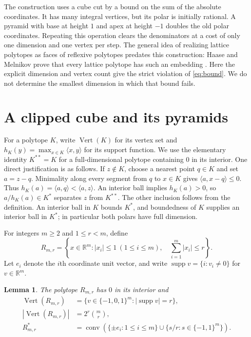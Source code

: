 \documentclass[11pt]{article}
\newtheorem{lemma}[theorem]{Lemma}
\newcommand{\conv}{\operatorname{conv}}
\newcommand{\vertices}{\operatorname{Vert}}
\newcommand{\supp}{\operatorname{supp}}
\begin{document}
The construction uses a cube cut by a bound on the sum of the absolute
coordinates. It has many integral vertices, but its polar is initially
rational. A pyramid with base at height $1$ and apex at height $-1$ doubles
the old polar coordinates. Repeating this operation clears the denominators
at a cost of only one dimension and one vertex per step.
The general idea of realizing lattice polytopes as faces of reflexive
polytopes predates this construction: Haase and Melnikov prove that every
lattice polytope has such an embedding \cite[Proposition~2.2]{HM}.
Here the explicit dimension and vertex count give the strict violation
of \eqref{eq:bound}. We do not determine the smallest dimension in which
that bound fails.

\section{A clipped cube and its pyramids}

For a polytope $K$, write $\vertices(K)$ for its vertex set and
$h_K(y)=\max_{x\in K}\langle x,y\rangle$ for its support function.
We use the elementary identity $K^{**}=K$ for a full-dimensional
polytope containing $0$ in its interior. One direct justification is as
follows. If $z\notin K$, choose a nearest point $q\in K$ and set $a=z-q$.
Minimality along every segment from $q$ to $x\in K$ gives
$\langle a,x-q\rangle\leq0$. Thus
$h_K(a)=\langle a,q\rangle<\langle a,z\rangle$.
An interior ball implies $h_K(a)>0$, so $a/h_K(a)\in K^*$ separates $z$
from $K^{**}$. The other inclusion follows from the definition.
An interior ball in $K$ bounds $K^*$, and boundedness of $K$ supplies an
interior ball in $K^*$; in particular both polars have full dimension.

For integers $m\geq2$ and $1\leq r<m$, define
\begin{equation}\label{eq:base}
 R_{m,r}=\left\{x\in\mathbb R^m:
           |x_i|\leq1\ (1\leq i\leq m),\quad
           \sum_{i=1}^m|x_i|\leq r\right\}.
\end{equation}
Let $e_i$ denote the $i$th coordinate unit vector, and write
$\supp v=\{i:v_i\neq0\}$ for $v\in\mathbb R^m$.

\begin{lemma}\label{lem:base}
The polytope $R_{m,r}$ has $0$ in its interior and
\begin{align}
 \vertices(R_{m,r})&=\{v\in\{-1,0,1\}^m:|\supp v|=r\},
                                                    \label{eq:basevertices}\\
 |\vertices(R_{m,r})|&=2^r\binom mr,                     \label{eq:basecount}\\
 R_{m,r}^*&=\conv\left(\{\pm e_i:1\leq i\leq m\}
                    \cup\{s/r:s\in\{-1,1\}^m\}\right).
                                                    \label{eq:basepolar}
\end{align}
\end{lemma}
\end{document}
